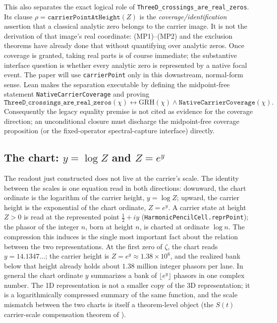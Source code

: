 \documentclass[11pt]{article}
\theoremstyle{definition}
\begin{document}
This also separates the exact logical role of
\texttt{ThreeD\_crossings\_are\_real\_zeros}.  Its clause
\(\rho=\texttt{carrierPointAtHeight}(Z)\) is the
\emph{coverage/identification}
assertion that a classical analytic zero belongs to the carrier image.  It
is not the derivation of that image's real coordinate: (MP1)--(MP2) and the
exclusion theorems have already done that without quantifying over analytic
zeros.  Once coverage is granted, taking real parts is of course immediate;
the substantive interface question is whether every analytic zero is
represented by a native focal event.  The paper will use
\texttt{carrierPoint} only in this downstream, normal-form sense.  Lean makes
the separation executable by defining the midpoint-free statement
\texttt{NativeCarrierCoverage} and proving
\[
 \texttt{ThreeD\_crossings\_are\_real\_zeros}(\chi)
 \leftrightarrow
 \mathrm{GRH}(\chi)\wedge\texttt{NativeCarrierCoverage}(\chi).
\]
Consequently the legacy equality premise is not cited as evidence for the
coverage direction; an unconditional closure must discharge the midpoint-free
coverage proposition (or the fixed-operator spectral-capture interface)
directly.

\subsection{The chart: \texorpdfstring{\(y=\log Z\) and
\(Z=e^{y}\)}{y = log Z and Z = e\^{}y}}\label{sec:grh-chart}

The readout just constructed does not live at the carrier's scale. The
identity between the scales is one equation read in both directions:
downward, the chart ordinate is the logarithm of the carrier height,
\(y=\log Z\); upward, the carrier height is the exponential of the chart
ordinate, \(Z=e^{y}\). A carrier state at height \(Z>0\) is read at the
represented point \(\tfrac12+iy\) (\texttt{HarmonicPencilCell.reprPoint});
the phasor of the integer \(n\), born at height \(n\), is charted at
ordinate \(\log n\). The compression this induces is the single most
important fact about the relation between the two representations. At the
first zero of \(\zeta\), the chart reads \(y=14.1347\ldots\); the carrier
height is \(Z=e^{y}\approx1.38\times10^{6}\), and the realized bank below
that height already holds about \(1.38\) million integer phasors per lane.
In general the chart ordinate \(y\) summarizes a bank of
\(\lfloor e^{y}\rfloor\) phasors in one complex number. The 1D representation
is not a smaller copy of the 3D representation; it is a logarithmically
compressed summary of the same function, and the scale mismatch between the
two charts is itself a theorem-level object (the \(S(t)\) carrier-scale
compensation theorem of \cite{UniversalCarrier}).
\end{document}
